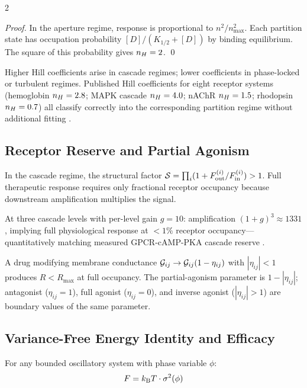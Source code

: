 \begin{multicols}{2}
\begin{proof}
In the aperture regime, response is proportional to $n^2/n_{\max}^2$. Each partition state has occupation probability $[D]/(K_{1/2}+[D])$ by binding equilibrium. The square of this probability gives $n_H = 2$. \qed
\end{proof}

Higher Hill coefficients arise in cascade regimes; lower coefficients in phase-locked or turbulent regimes. Published Hill coefficients for eight receptor systems (hemoglobin $n_H = 2.8$; MAPK cascade $n_H = 4.0$; nAChR $n_H = 1.5$; rhodopsin $n_H = 0.7$) all classify correctly into the corresponding partition regime without additional fitting \citep{hill1910,mwc_1965,koshland_1966}.

\subsection{Receptor Reserve and Partial Agonism}

\begin{corollary}
In the cascade regime, the structural factor $\mathcal{S} = \prod_i(1+F_{\mathrm{out}}^{(i)}/F_{\mathrm{in}}^{(i)}) > 1$. Full therapeutic response requires only fractional receptor occupancy because downstream amplification multiplies the signal.
\end{corollary}

At three cascade levels with per-level gain $g = 10$: amplification $(1+g)^3 \approx 1331$, implying full physiological response at $< 1\%$ receptor occupancy---quantitatively matching measured GPCR-cAMP-PKA cascade reserve \citep{stephenson_1956}.

\begin{corollary}
A drug modifying membrane conductance $\mathcal{G}_{ij} \to \mathcal{G}_{ij}(1 - \eta_{ij})$ with $|\eta_{ij}| < 1$ produces $R < R_{\max}$ at full occupancy. The partial-agonism parameter is $1 - |\eta_{ij}|$; antagonist ($\eta_{ij} = 1$), full agonist ($\eta_{ij} = 0$), and inverse agonist ($|\eta_{ij}| > 1$) are boundary values of the same parameter.
\end{corollary}

\subsection{Variance-Free Energy Identity and Efficacy}

\begin{theorem}
\label{thm:ch12_varfree}
For any bounded oscillatory system with phase variable $\phi$:
\begin{equation}
F = k_{\mathrm{B}} T\cdot\sigma^2(\phi)
\label{eq:ch12_varfree}
\end{equation}
\end{theorem}


\end{multicols}
